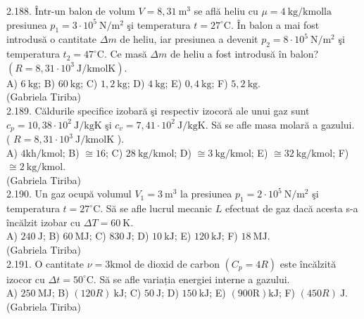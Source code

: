 \documentclass[10pt]{article}
\begin{document}
2.188. Într-un balon de volum $V=8,31 \mathrm{~m}^{3}$ se află heliu cu $\mu=4 \mathrm{~kg} / \mathrm{kmol} \mathrm{la}$ presiunea $p_{1}=3 \cdot 10^{5} \mathrm{~N} / \mathrm{m}^{2}$ şi temperatura $t=27^{\circ} \mathrm{C}$. În balon a mai fost introdusă o cantitate $\Delta m$ de heliu, iar presiunea a devenit $p_{2}=8 \cdot 10^{5} \mathrm{~N} / \mathrm{m}^{2}$ şi temperatura $t_{2}=47^{\circ} \mathrm{C}$. Ce masă $\Delta m$ de heliu a fost introdusă în balon? $\left(R=8,31 \cdot 10^{3} \mathrm{~J} / \mathrm{kmol} \mathrm{K}\right)$.\\ A) $6 \mathrm{~kg}$; B) $60 \mathrm{~kg}$; C) $1,2 \mathrm{~kg}$; D) $4 \mathrm{~kg}$; E) $0,4 \mathrm{~kg}$; F) $5,2 \mathrm{~kg}$.\\ (Gabriela Tiriba)\\

2.189. Căldurile specifice izobară şi respectiv izocoră ale unui gaz sunt $c_{p}=10,38 \cdot 10^{2} \mathrm{~J} / \mathrm{kgK}$ şi $c_{v}=7,41 \cdot 10^{2} \mathrm{~J} / \mathrm{kgK}$. Să se afle masa molară a gazului. ( $R=8,31 \cdot 10^{3} \mathrm{~J} / \mathrm{kmolK}$ ).\\ A) $4 \mathrm{kh} / \mathrm{kmol}$; B) $\cong 16$; C) $28 \mathrm{~kg} / \mathrm{kmol}$; D) $\cong 3 \mathrm{~kg} / \mathrm{kmol}$; E) $\cong 32 \mathrm{~kg} / \mathrm{kmol}$; F) $\cong 2 \mathrm{~kg} / \mathrm{kmol}$.\\ (Gabriela Tiriba)\\

2.190. Un gaz ocupă volumul $V_{1}=3 \mathrm{~m}^{3}$ la presiunea $p_{1}=2 \cdot 10^{5} \mathrm{~N} / \mathrm{m}^{2}$ şi temperatura $t=27^{\circ} \mathrm{C}$. Să se afle lucrul mecanic $L$ efectuat de gaz dacă acesta s-a încălzit izobar cu $\Delta T=60 \mathrm{~K}$.\\ A) $240 \mathrm{~J}$; B) $60 \mathrm{~MJ}$; C) $830 \mathrm{~J}$; D) $10 \mathrm{~kJ}$; E) $120 \mathrm{~kJ}$; F) $18 \mathrm{~MJ}$.\\ (Gabriela Tiriba)\\

2.191. O cantitate $\nu=3 \mathrm{kmol}$ de dioxid de carbon $\left(C_{p}=4 R\right)$ este încălzită izocor cu $\Delta t=50^{\circ} \mathrm{C}$. Să se afle variația energiei interne a gazului.\\ A) $250 \mathrm{~MJ}$; B) $( 120 R ) \mathrm{~kJ}$; C) $50 \mathrm{~J}$; D) $150 \mathrm{~kJ}$; E) $(900 \mathrm{R}) \mathrm{kJ}$; F) $( 450 R ) \mathrm{~J}$.\\ (Gabriela Tiriba)\\
\end{document}
